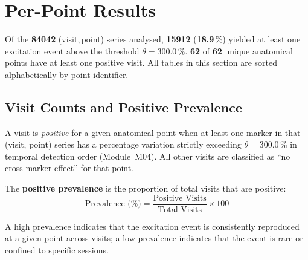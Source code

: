 \documentclass[a4paper,11pt]{article}
\begin{document}
\section{Per-Point Results}

\noindent
Of the \textbf{84042} (visit,\,point) series analysed,
\textbf{15912} (\textbf{18.9}\,\%) yielded at least one
excitation event above the threshold $\theta = 300.0\,\%$.
\textbf{62} of \textbf{62} unique anatomical points
have at least one positive visit.
All tables in this section are sorted alphabetically by point identifier.

\subsection{Visit Counts and Positive Prevalence}

A visit is \emph{positive} for a given anatomical point when at least one marker in that
(visit, point) series has a percentage variation strictly exceeding
$\theta = 300.0\,\%$ in temporal detection order (Module~M04).
All other visits are classified as ``no cross-marker effect'' for that point.

The \textbf{positive prevalence} is the proportion of total visits that are positive:
\[
  \text{Prevalence (\%)} = \frac{\text{Positive Visits}}{\text{Total Visits}} \times 100
\]

A high prevalence indicates that the excitation event is consistently reproduced at a given
point across visits; a low prevalence indicates that the event is rare or confined to
specific sessions.
\end{document}

